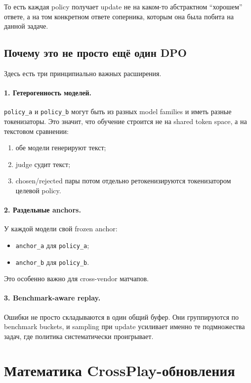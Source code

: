 \documentclass[11pt,a4paper]{article}
\begin{document}
То есть каждая policy получает update не на каком-то абстрактном ``хорошем'' ответе, а на том конкретном ответе соперника, которым она была побита на данной задаче.

\subsection{Почему это не просто ещё один DPO}

Здесь есть три принципиально важных расширения.

\paragraph{1. Гетерогенность моделей.}
\texttt{policy\_a} и \texttt{policy\_b} могут быть из разных model families и иметь разные токенизаторы. Это значит, что обучение строится не на shared token space, а на текстовом сравнении:
\begin{enumerate}[label=\arabic*.]
  \item обе модели генерируют текст;
  \item judge судит текст;
  \item chosen/rejected пары потом отдельно ретокенизируются токенизатором целевой policy.
\end{enumerate}

\paragraph{2. Раздельные anchors.}
У каждой модели свой frozen anchor:
\begin{itemize}
  \item \texttt{anchor\_a} для \texttt{policy\_a};
  \item \texttt{anchor\_b} для \texttt{policy\_b}.
\end{itemize}
Это особенно важно для cross-vendor матчапов.

\paragraph{3. Benchmark-aware replay.}
Ошибки не просто складываются в один общий буфер. Они группируются по benchmark buckets, и sampling при update усиливает именно те подмножества задач, где политика систематически проигрывает.

\section{Математика CrossPlay-обновления}
\end{document}
